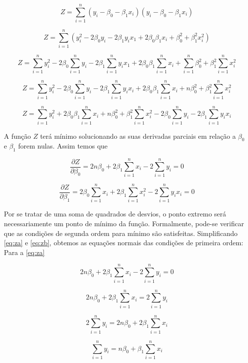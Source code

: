 $$ Z = \sum_{i=1}^{n} (y_i - \beta_0 - \beta_1 x_i)(y_i - \beta_0 - \beta_1 x_i)$$

$$Z = \sum_{i=1}^{n} (y^2_i - 2\beta_0 y_i - 2\beta_1 y_i x_1 + 2\beta_0 \beta_1 x_i + \beta_0^{2} + \beta_1^{2} x_i^{2})$$

$$Z = \sum_{i=1}^{n} y^2_i - 2 \beta_0 \sum_{i=1}^{n}  y_i - 2 \beta_1 \sum_{i=1}^{n}  y_i x_1 + 2 \beta_0 \beta_1 \sum_{i=1}^{n}  x_i +  \sum_{i=1}^{n} \beta_0^{2} + \beta_1^{2} \sum_{i=1}^{n}  x_i^{2}$$

$$Z = \sum_{i=1}^{n} y^2_i - 2 \beta_0 \sum_{i=1}^{n}  y_i - 2 \beta_1 \sum_{i=1}^{n}  y_i x_i + 2 \beta_0 \beta_1 \sum_{i=1}^{n}  x_i +  n \beta_0^{2} + \beta_1^{2} \sum_{i=1}^{n}  x_i^{2}$$

$$Z = \sum_{i=1}^{n} y^2_i + 2 \beta_0 \beta_1 \sum_{i=1}^{n}  x_i +  n \beta_0^{2} + \beta_1^{2} \sum_{i=1}^{n}  x_i^{2} - 2 \beta_0 \sum_{i=1}^{n}  y_i - 2 \beta_1 \sum_{i=1}^{n}  y_i x_i$$

\noindent A função $Z$ terá mínimo solucionando as suas derivadas parciais em relação a $\beta_0$ e $\beta_1$ forem nulas. Assim temos que


\begin{equation}
\label{eq:za}
\frac{\partial Z}{\partial \beta_0} = 2n \beta_0 + 2 \beta_1 \sum_{i=1}^{n}  x_i  - 2 \sum_{i=1}^{n}  y_i = 0
\end{equation}

\begin{equation}
\label{eq:zb}
\frac{\partial Z}{\partial \beta_1} = 2 \beta_0 \sum_{i=1}^{n}  x_i + 2 \beta_1 \sum_{i=1}^{n}  x_i^{2} - 2 \sum_{i=1}^{n}  y_i x_i = 0
\end{equation}

\noindent Por se tratar de uma soma de quadrados de desvios, o ponto extremo será necessariamente um ponto de mínimo da função. Formalmente, pode-se verificar que as condições de segunda ordem para mínimo são satisfeitas. Simplificando \autoref{eq:za} e \autoref{eq:zb}, obtemos as equações normais das condições de primeira ordem: Para a \autoref{eq:za}

$$ 2n \beta_0 + 2 \beta_1 \sum_{i=1}^{n}  x_i  - 2 \sum_{i=1}^{n}  y_i = 0 $$

$$ 2n \beta_0 + 2 \beta_1 \sum_{i=1}^{n}  x_i  = 2 \sum_{i=1}^{n}  y_i$$

$$ 2 \sum_{i=1}^{n}  y_i = 2n \beta_0 + 2 \beta_1 \sum_{i=1}^{n}  x_i$$

$$ \boxed{\sum_{i=1}^{n}  y_i = n \beta_0 + \beta_1 \sum_{i=1}^{n}  x_i}$$

